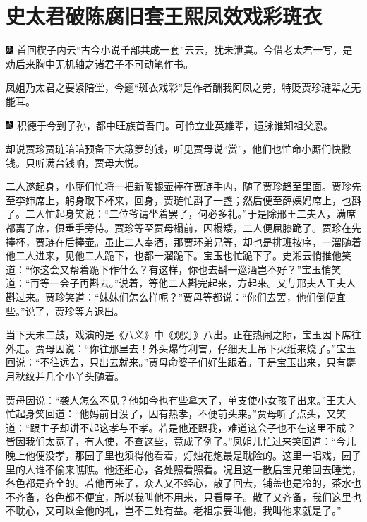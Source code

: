 

\chapter{史太君破陈腐旧套\hspace{.5em}王熙凤效戏彩斑衣}

{\includegraphics[width=3mm]{../Images/00004}  \kaishu 首回楔子内云“古今小说千部共成一套”云云，犹未泄真。今借老太君一写，是劝后来胸中无机轴之诸君子不可动笔作书。

凤姐乃太君之要紧陪堂，今题“斑衣戏彩”是作者酬我阿凤之劳，特贬贾珍琏辈之无能耳。}

{\includegraphics[width=3mm]{../Images/00005}  \kaishu 积德于今到子孙，都中旺族首吾门。可怜立业英雄辈，遗脉谁知祖父恩。}

却说贾珍贾琏暗暗预备下大簸箩的钱，听见贾母说“赏”，他们也忙命小厮们快撒钱。只听满台钱响，贾母大悦。

二人遂起身，小厮们忙将一把新暖银壶捧在贾琏手内，随了贾珍趋至里面。贾珍先至李婶席上，躬身取下杯来，回身，贾琏忙斟了一盏；然后便至薛姨妈席上，也斟了。二人忙起身笑说：“二位爷请坐着罢了，何必多礼。”于是除邢王二夫人，满席都离了席，俱垂手旁侍。贾珍等至贾母榻前，因榻矮，二人便屈膝跪了。贾珍在先捧杯，贾琏在后捧壶。虽止二人奉酒，那贾环弟兄等，却也是排班按序，一溜随着他二人进来，见他二人跪下，也都一溜跪下。宝玉也忙跪下了。史湘云悄推他笑道：“你这会又帮着跪下作什么？有这样，你也去斟一巡酒岂不好？”宝玉悄笑道：“再等一会子再斟去。”说着，等他二人斟完起来，方起来。又与邢夫人王夫人斟过来。贾珍笑道：“妹妹们怎么样呢？”贾母等都说：“你们去罢，他们倒便宜些。”说了，贾珍等方退出。

当下天未二鼓，戏演的是《八义》中《观灯》八出。正在热闹之际，宝玉因下席往外走。贾母因说：“你往那里去！外头爆竹利害，仔细天上吊下火纸来烧了。”宝玉回说：“不往远去，只出去就来。”贾母命婆子们好生跟着。于是宝玉出来，只有麝月秋纹并几个小丫头随着。

贾母因说：“袭人怎么不见？他如今也有些拿大了，单支使小女孩子出来。”王夫人忙起身笑回道：“他妈前日没了，因有热孝，不便前头来。”贾母听了点头，又笑道：“跟主子却讲不起这孝与不孝。若是他还跟我，难道这会子也不在这里不成？皆因我们太宽了，有人使，不查这些，竟成了例了。”凤姐儿忙过来笑回道：“今儿晚上他便没孝，那园子里也须得他看着，灯烛花炮最是耽险的。这里一唱戏，园子里的人谁不偷来瞧瞧。他还细心，各处照看照看。况且这一散后宝兄弟回去睡觉，各色都是齐全的。若他再来了，众人又不经心，散了回去，铺盖也是冷的，茶水也不齐备，各色都不便宜，所以我叫他不用来，只看屋子。散了又齐备，我们这里也不耽心，又可以全他的礼，岂不三处有益。老祖宗要叫他，我叫他来就是了。”

